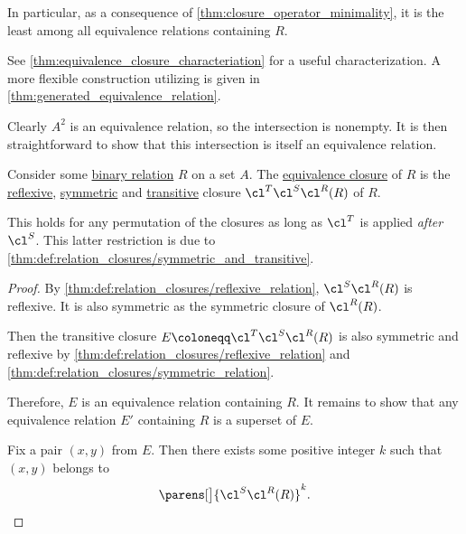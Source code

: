 \begin{comments}
\begin{comments}
  In particular, as a consequence of \cref{thm:closure_operator_minimality}, it is the least among all equivalence relations containing \( R \).

  \item See \cref{thm:equivalence_closure_characteriation} for a useful characterization. A more flexible construction utilizing  is given in \cref{thm:generated_equivalence_relation}.
\end{comments}
\begin{defproof}
  Clearly \( A^2 \) is an equivalence relation, so the intersection is nonempty. It is then straightforward to show that this intersection is itself an equivalence relation.
\end{defproof}

\begin{proposition}\label{thm:equivalence_closure_characteriation}
  Consider some \hyperref[def:binary_relation]{binary relation} \( R \) on a set \( A \). The \hyperref[def:equivalence_closure]{equivalence closure} of \( R \) is the \hyperref[def:relation_closures/reflexive]{reflexive}, \hyperref[def:relation_closures/symmetric]{symmetric} and \hyperref[def:relation_closures/transitive]{transitive} closure \( \cl^T \cl^S \cl^R (R) \) of \( R \).
\end{proposition}
\begin{comments}
  \item This holds for any permutation of the closures as long as \( \cl^T \) is applied \emph{after} \( \cl^S \). This latter restriction is due to \cref{thm:def:relation_closures/symmetric_and_transitive}.
\end{comments}
\begin{proof}
  By \cref{thm:def:relation_closures/reflexive_relation}, \( \cl^S \cl^R (R) \) is reflexive. It is also symmetric as the symmetric closure of \( \cl^R(R) \).

  Then the transitive closure \( E \coloneqq \cl^T \cl^S \cl^R (R) \) is also symmetric and reflexive by \cref{thm:def:relation_closures/reflexive_relation} and \cref{thm:def:relation_closures/symmetric_relation}.

  Therefore, \( E \) is an equivalence relation containing \( R \). It remains to show that any equivalence relation \( E' \) containing \( R \) is a superset of \( E \).

  Fix a pair \( (x, y) \) from \( E \). Then there exists some positive integer \( k \) such that \( (x, y) \) belongs to
  \begin{equation*}
    \parens[\big]{ \cl^S \cl^R (R) }^k.
  \end{equation*}


\end{proof}
\end{comments}
